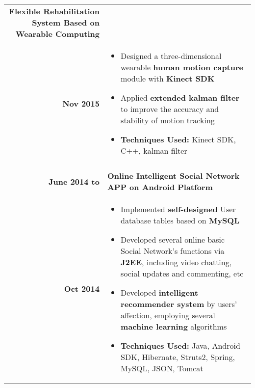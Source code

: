 \documentclass[a4paper, 11pt]{extarticle} %
\begin{document}
\begin{longtable}{r | p{16cm}}
		 \textbf{Flexible Rehabilitation System Based on Wearable Computing}  \\
		
			\textbf{Nov 2015}		
&

\small{

\vspace{-0.3cm}


\begin{itemize}[leftmargin=*]
\item Designed a three-dimensional wearable \textbf{human motion capture} module with \textbf{Kinect SDK}
\item Applied \textbf{extended kalman filter} to improve the accuracy and stability of motion tracking
\item \textbf{Techniques Used:} Kinect SDK, C++, kalman filter
\vspace{-0.4cm}

\end{itemize}
}\\


\multicolumn{2}{c}{} \\
			\textbf{June 2014 to}
		
		 &
		
		 \textbf{Online Intelligent Social Network APP on Android Platform}  \\
		
			\textbf{Oct 2014}
&

\small{

\vspace{-0.3cm}

\begin{itemize}[leftmargin=*]
\item Implemented \textbf{self-designed} User database tables based on \textbf{MySQL}

\item Developed several online basic Social Network’s functions via \textbf{J2EE}, including video chatting, social updates and commenting, etc

\item Developed \textbf{intelligent recommender system} by users’ affection, employing several \textbf{machine learning} algorithms

\item \textbf{Techniques Used:} Java, Android SDK, Hibernate, Struts2, Spring, MySQL, JSON, Tomcat
\vspace{-0.3cm}

\end{itemize}

}
\\


\end{longtable}
\end{document}

